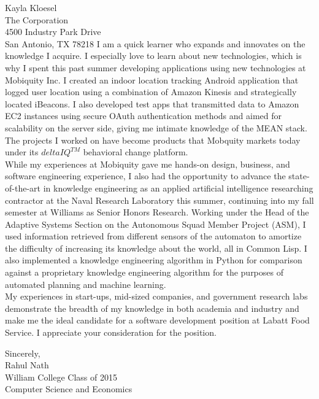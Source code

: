 \documentclass[11pt]{letter} %
\newcommand{\forceindent}{\leavevmode{\parindent=24pt\indent}}
\begin{document}
\begin{letter}{Kayla Kloesel \\
The Corporation \\
4500 Industry Park Drive \\
San Antonio, TX 78218}
\forceindent I am a quick learner who expands and innovates on the knowledge I acquire. I especially love to learn about new technologies, which is why I spent this past summer developing applications using new technologies at Mobiquity Inc. I created an indoor location tracking Android application that logged user location using a combination of Amazon Kinesis and strategically located iBeacons. I also developed test apps that transmitted data to Amazon EC2 instances using secure OAuth authentication methods and aimed for scalability on the server side, giving me intimate knowledge of the MEAN stack. The projects I worked on have become products that Mobquity markets today under its $deltaIQ^{TM}$ behavioral change platform. \\ %

\forceindent While my experiences at Mobiquity gave me hands-on design, business, and software engineering experience, I also had the opportunity to advance the state-of-the-art in knowledge engineering as an applied artificial intelligence researching contractor at the Naval Research Laboratory this summer, continuing into my fall semester at Williams as Senior Honors Research. Working under the Head of the Adaptive Systems Section on the Autonomous Squad Member Project (ASM), I used information retrieved from different sensors of the automaton to amortize the difficulty of increasing its knowledge about the world, all in Common Lisp. I also implemented a knowledge engineering algorithm in Python for comparison against a proprietary knowledge engineering algorithm for the purposes of automated planning and machine learning. \\

\forceindent My experiences in start-ups, mid-sized companies, and government research labs demonstrate the breadth of my knowledge in both academia and industry and make me the ideal candidate for a software development position at Labatt Food Service. I appreciate your consideration for the position.

\closing{Sincerely,\\
Rahul Nath \\
William College Class of 2015  \\
Computer Science and Economics}



\end{letter}
\end{document}
